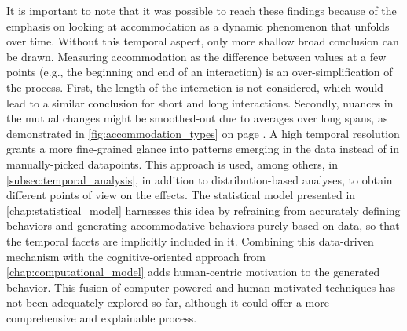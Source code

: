 It is important to note that it was possible to reach these findings because of the emphasis on looking at accommodation as a dynamic phenomenon that unfolds over time.
Without this temporal aspect, only more shallow broad conclusion can be drawn.
Measuring accommodation as the difference between values at a few points (e.g., the beginning and end of an interaction) is an over-simplification of the process.
First, the length of the interaction is not considered, which would lead to a similar conclusion for short and long interactions.
Secondly, nuances in the mutual changes might be smoothed-out due to averages over long spans, as demonstrated in \cref{fig:accommodation_types} on page \pageref{fig:accommodation_types}.
A high temporal resolution grants a more fine-grained glance into patterns emerging in the data instead of in manually-picked datapoints.
This approach is used, among others, in \cref{subsec:temporal_analysis}, in addition to distribution-based analyses, to obtain different points of view on the effects.
The statistical model presented in \cref{chap:statistical_model} harnesses this idea by refraining from accurately defining behaviors and generating accommodative behaviors purely based on data, so that the temporal facets are implicitly included in it.
Combining this data-driven mechanism with the cognitive-oriented approach from \cref{chap:computational_model} adds human-centric motivation to the generated behavior.
This fusion of computer-powered and human-motivated techniques has not been adequately explored so far, although it could offer a more comprehensive and explainable process.

